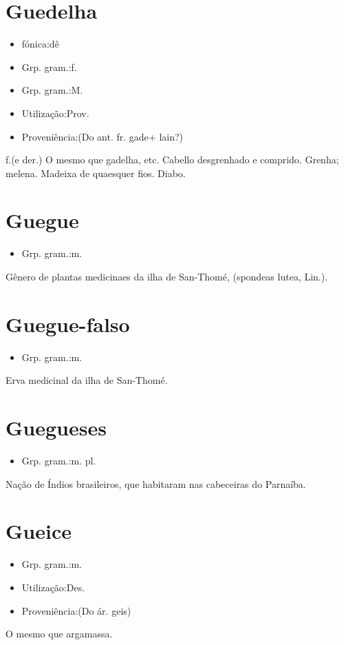 \section{Guedelha}
\begin{itemize}
\item {fónica:dê}
\end{itemize}
\begin{itemize}
\item {Grp. gram.:f.}
\end{itemize}
\begin{itemize}
\item {Grp. gram.:M.}
\end{itemize}
\begin{itemize}
\item {Utilização:Prov.}
\end{itemize}
\begin{itemize}
\item {Proveniência:(Do ant. fr. \textunderscore gade\textunderscore  + \textunderscore lain\textunderscore ?)}
\end{itemize}
\textunderscore f.\textunderscore  (e der.)
O mesmo que \textunderscore gadelha\textunderscore , etc.
Cabello desgrenhado e comprido.
Grenha; melena.
Madeixa de quaesquer fios.
Diabo.
\section{Guegue}
\begin{itemize}
\item {Grp. gram.:m.}
\end{itemize}
Gênero de plantas medicinaes da ilha de San-Thomé, (\textunderscore spondeas lutea\textunderscore , Lin.).
\section{Guegue-falso}
\begin{itemize}
\item {Grp. gram.:m.}
\end{itemize}
Erva medicinal da ilha de San-Thomé.
\section{Guegueses}
\begin{itemize}
\item {Grp. gram.:m. pl.}
\end{itemize}
Nação de Índios brasileiros, que habitaram nas cabeceiras do Parnaíba.
\section{Gueice}
\begin{itemize}
\item {Grp. gram.:m.}
\end{itemize}
\begin{itemize}
\item {Utilização:Des.}
\end{itemize}
\begin{itemize}
\item {Proveniência:(Do ár. \textunderscore geis\textunderscore )}
\end{itemize}
O mesmo que \textunderscore argamassa\textunderscore .
